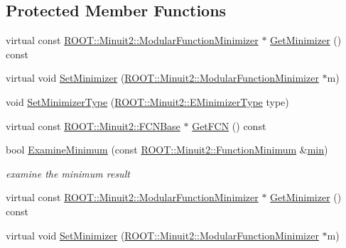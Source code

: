 \subsection*{Protected Member Functions}
\begin{DoxyCompactItemize}
\item 
virtual const \mbox{\hyperlink{classROOT_1_1Minuit2_1_1ModularFunctionMinimizer}{R\+O\+O\+T\+::\+Minuit2\+::\+Modular\+Function\+Minimizer}} $\ast$ \mbox{\hyperlink{classROOT_1_1Minuit2_1_1Minuit2Minimizer_a43246cb7bf4e7553d8e2e9fe25722cb4}{Get\+Minimizer}} () const
\item 
virtual void \mbox{\hyperlink{classROOT_1_1Minuit2_1_1Minuit2Minimizer_acbb90c93015f5cf8e5ee99881a305019}{Set\+Minimizer}} (\mbox{\hyperlink{classROOT_1_1Minuit2_1_1ModularFunctionMinimizer}{R\+O\+O\+T\+::\+Minuit2\+::\+Modular\+Function\+Minimizer}} $\ast$m)
\item 
void \mbox{\hyperlink{classROOT_1_1Minuit2_1_1Minuit2Minimizer_a9f1b93afd722023e5c879453e65f1041}{Set\+Minimizer\+Type}} (\mbox{\hyperlink{namespaceROOT_1_1Minuit2_abdfae3dff24b1dc5a23955c06fe2a8d6}{R\+O\+O\+T\+::\+Minuit2\+::\+E\+Minimizer\+Type}} type)
\item 
virtual const \mbox{\hyperlink{classROOT_1_1Minuit2_1_1FCNBase}{R\+O\+O\+T\+::\+Minuit2\+::\+F\+C\+N\+Base}} $\ast$ \mbox{\hyperlink{classROOT_1_1Minuit2_1_1Minuit2Minimizer_aee4d274acbb0db4702010a62ebdd4d56}{Get\+F\+CN}} () const
\item 
bool \mbox{\hyperlink{classROOT_1_1Minuit2_1_1Minuit2Minimizer_a004057cf512dcbd986799fabe756cecc}{Examine\+Minimum}} (const \mbox{\hyperlink{classROOT_1_1Minuit2_1_1FunctionMinimum}{R\+O\+O\+T\+::\+Minuit2\+::\+Function\+Minimum}} \&\mbox{\hyperlink{adat__devel_2lib_2SU3_2SU3__internal_8h_ab0f5fed3171eb00d1c5f037d9f518a23}{min}})
\begin{DoxyCompactList}\small\item\em examine the minimum result \end{DoxyCompactList}\item 
virtual const \mbox{\hyperlink{classROOT_1_1Minuit2_1_1ModularFunctionMinimizer}{R\+O\+O\+T\+::\+Minuit2\+::\+Modular\+Function\+Minimizer}} $\ast$ \mbox{\hyperlink{classROOT_1_1Minuit2_1_1Minuit2Minimizer_a43246cb7bf4e7553d8e2e9fe25722cb4}{Get\+Minimizer}} () const
\item 
virtual void \mbox{\hyperlink{classROOT_1_1Minuit2_1_1Minuit2Minimizer_acbb90c93015f5cf8e5ee99881a305019}{Set\+Minimizer}} (\mbox{\hyperlink{classROOT_1_1Minuit2_1_1ModularFunctionMinimizer}{R\+O\+O\+T\+::\+Minuit2\+::\+Modular\+Function\+Minimizer}} $\ast$m)

\end{DoxyCompactItemize}
